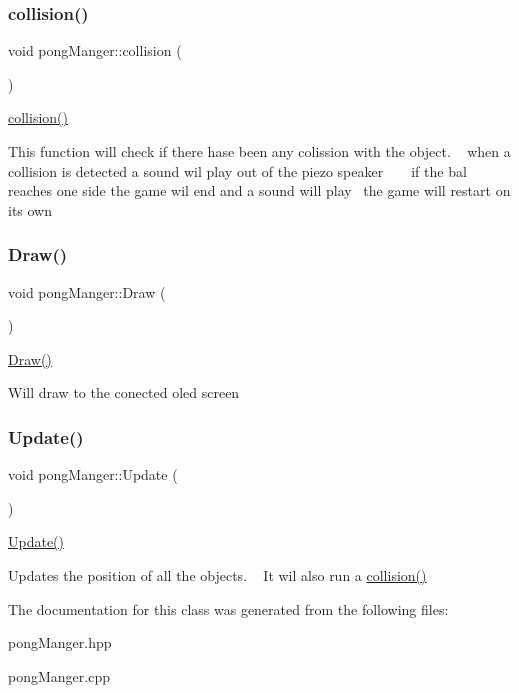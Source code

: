 \subsubsection{\texorpdfstring{collision()}{collision()}}
{\footnotesize\ttfamily void pong\+Manger\+::collision (\begin{DoxyParamCaption}{ }\end{DoxyParamCaption})}



\mbox{\hyperlink{classpong_manger_a177da6a9f5120dc153b8f33d8e6bebc3}{collision()}} 

This function will check if there hase been any colission with the object. ~\newline
when a collision is detected a sound wil play out of the piezo speaker ~\newline
~\newline
if the bal reaches one side the game wil end and a sound will play~\newline
the game will restart on its own \mbox{\label{classpong_manger_a2c2c6e7f024261d5b3e3f4b85abb060a}} 
\subsubsection{\texorpdfstring{Draw()}{Draw()}}
{\footnotesize\ttfamily void pong\+Manger\+::\+Draw (\begin{DoxyParamCaption}{ }\end{DoxyParamCaption})}



\mbox{\hyperlink{classpong_manger_a2c2c6e7f024261d5b3e3f4b85abb060a}{Draw()}} 

Will draw to the conected oled screen \mbox{\label{classpong_manger_a878b50d69f98eb0de013269fbf9b0ead}} 
\subsubsection{\texorpdfstring{Update()}{Update()}}
{\footnotesize\ttfamily void pong\+Manger\+::\+Update (\begin{DoxyParamCaption}{ }\end{DoxyParamCaption})}



\mbox{\hyperlink{classpong_manger_a878b50d69f98eb0de013269fbf9b0ead}{Update()}} 

Update\textquotesingle{}s the position of all the objects. ~\newline
It wil also run a \mbox{\hyperlink{classpong_manger_a177da6a9f5120dc153b8f33d8e6bebc3}{collision()}} 

The documentation for this class was generated from the following files\+:\begin{DoxyCompactItemize}
\item 
pong\+Manger.\+hpp\item 
pong\+Manger.\+cpp\end{DoxyCompactItemize}
